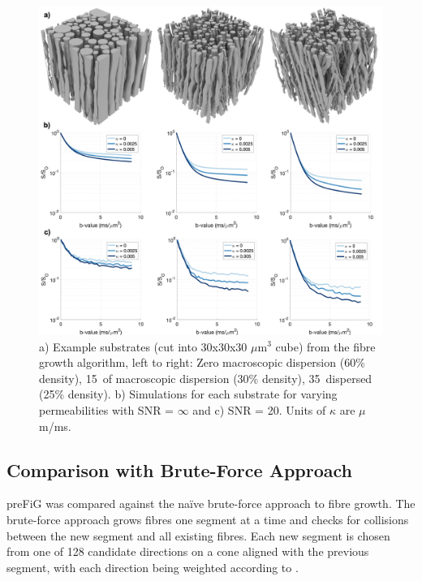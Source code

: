 \begin{figure}[h!]
  \centering
  \includegraphics[width=\textwidth]{figures/ipmi_implementation/substrates_and_signals_otherlabels.png}
  \caption[Examples of generate WM numerical phantoms and simulated dMRI signals]{\small a) Example substrates (cut into 30x30x30 $\mu$m$^3$ cube) from the fibre growth algorithm, left to right:  Zero macroscopic dispersion (60\% density), 15\degree\ of macroscopic dispersion (30\% density), 35\degree\ dispersed (25\% density). b) Simulations for each substrate for varying permeabilities with SNR = $\infty$  and c) SNR = 20. Units of $\kappa$ are $\mu$m/ms.}
  \label{fig:ipmi_substrates_signals}
\end{figure}

\subsection{Comparison with Brute-Force Approach}
\label{sec:impi_bruteforce}
\ac{preFiG} was compared against the na\"ive brute-force approach to fibre growth.
The brute-force approach grows fibres one segment at a time and checks for collisions between the new segment and all existing fibres.
Each new segment is chosen from one of 128 candidate directions on a cone aligned with the previous segment, with each direction being weighted according to .

